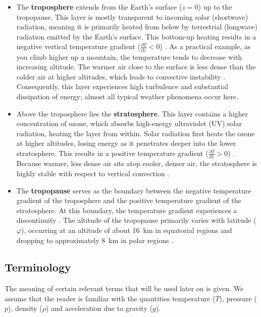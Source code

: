 \documentclass{article}
\begin{document}
\begin{itemize}
    \item The \textbf{troposphere} extends from the Earth's surface ($z=0$) up to the tropopause. This layer is mostly transparent to incoming solar (shortwave) radiation, meaning it is primarily heated from below by terrestrial (longwave) radiation emitted by the Earth's surface. This bottom-up heating results in a negative vertical temperature gradient ($\frac{\partial T}{\partial z} < 0$) \cite{Vallis2017}. As a practical example, as you climb higher up a mountain, the temperature tends to decrease with increasing altitude. The warmer air close to the surface is less dense than the colder air at higher altitudes, which leads to convective instability \cite{danielson2003meteorology}. Consequently, this layer experiences high turbulence \cite{sprenger2007userguide} and substantial dissipation of energy; almost all typical weather phenomena occur here.

    \item Above the troposphere lies the \textbf{stratosphere}. This layer contains a higher concentration of ozone, which absorbs high-energy ultraviolet (UV) solar radiation, heating the layer from within. Solar radiation first heats the ozone at higher altitudes, losing energy as it penetrates deeper into the lower stratosphere. This results in a positive temperature gradient ($\frac{\partial T}{\partial z} > 0$) \cite{Vallis2017}. Because warmer, less dense air sits atop cooler, denser air, the stratosphere is highly stable with respect to vertical convection \cite{Barnes2022main}.

    \item The \textbf{tropopause} serves as the boundary between the negative temperature gradient of the troposphere and the positive temperature gradient of the stratosphere. At this boundary, the temperature gradient experiences a discontinuity \cite{Panchev1985-et}. The altitude of the tropopause primarily varies with latitude ($\varphi$), occurring at an altitude of about \qty{16}{\km} in equatorial regions and dropping to approximately \qty{8}{\km} in polar regions \cite{Vallis2017}.
\end{itemize}

\subsection{Terminology}
The meaning of certain relevant terms that will be used later on is given. We assume that the reader is familiar with the quantities temperature ($T$), pressure ($p$), density ($\rho$) and acceleration due to gravity ($g$).
\end{document}
